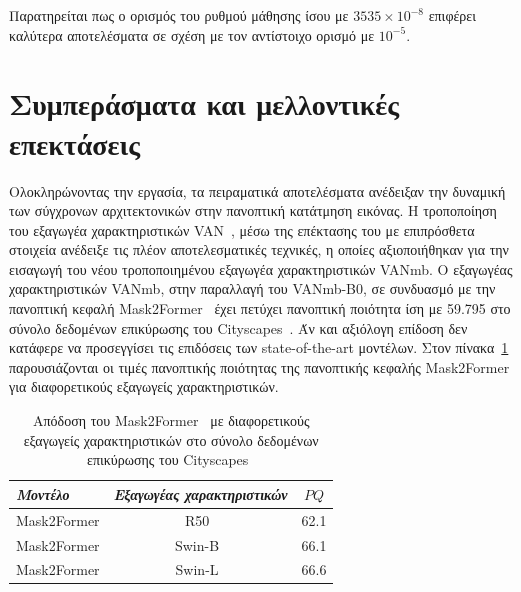 \documentclass[12pt]{article}
\numberwithin{equation}{section}
\begin{document}
Παρατηρείται πως ο ορισμός του ρυθμού μάθησης ίσου με \(3535 \times 10^{-8}\) επιφέρει καλύτερα αποτελέσματα σε σχέση με τον αντίστοιχο ορισμό με \(10^{-5}\).\\

\newpage

\section{Συμπεράσματα και μελλοντικές επεκτάσεις}

Ολοκληρώνοντας την εργασία, τα πειραματικά αποτελέσματα ανέδειξαν την δυναμική των σύγχρονων αρχιτεκτονικών στην πανοπτική κατάτμηση εικόνας. Η τροποποίηση του εξαγωγέα χαρακτηριστικών VAN~\cite{guo2022visualattentionnetwork}, μέσω της επέκτασης του με επιπρόσθετα στοιχεία ανέδειξε τις πλέον αποτελεσματικές τεχνικές, η οποίες αξιοποιήθηκαν για την εισαγωγή του νέου τροποποιημένου εξαγωγέα χαρακτηριστικών VANmb. Ο εξαγωγέας χαρακτηριστικών VANmb, στην παραλλαγή του VANmb-B0, σε συνδυασμό με την πανοπτική κεφαλή Mask2Former~\cite{cheng2022maskedattentionmasktransformeruniversal} έχει πετύχει πανοπτική ποιότητα ίση με 59.795 στο σύνολο δεδομένων επικύρωσης του Cityscapes~\cite{DBLP:journals/corr/CordtsORREBFRS16}. Άν και αξιόλογη επίδοση δεν κατάφερε να προσεγγίσει τις επιδόσεις των state-of-the-art μοντέλων. Στον πίνακα~\ref{tab:mask2former-backbones} παρουσιάζονται οι τιμές πανοπτικής ποιότητας της πανοπτικής κεφαλής Mask2Former για διαφορετικούς εξαγωγείς χαρακτηριστικών. \\

\begin{table}[H]
\centering
\setlength{\tabcolsep}{38pt} %
\begin{tabular}{lcc}
\toprule
\emph{Μοντέλο} & \emph{Εξαγωγέας χαρακτηριστικών} & \emph{\(PQ\)} \\
\midrule
Mask2Former & R50~\cite{he2015deepresiduallearningimage}    & 62.1 \\
Mask2Former & Swin-B~\cite{liu2021swintransformerhierarchicalvision} & 66.1 \\
Mask2Former & Swin-L~\cite{liu2021swintransformerhierarchicalvision} & 66.6 \\
\bottomrule
\end{tabular}
\caption{Απόδοση του Mask2Former~\cite{cheng2022maskedattentionmasktransformeruniversal} με διαφορετικούς εξαγωγείς χαρακτηριστικών στο σύνολο δεδομένων επικύρωσης του Cityscapes~\cite{DBLP:journals/corr/CordtsORREBFRS16}}
\label{tab:mask2former-backbones}
\end{table}
\end{document}
